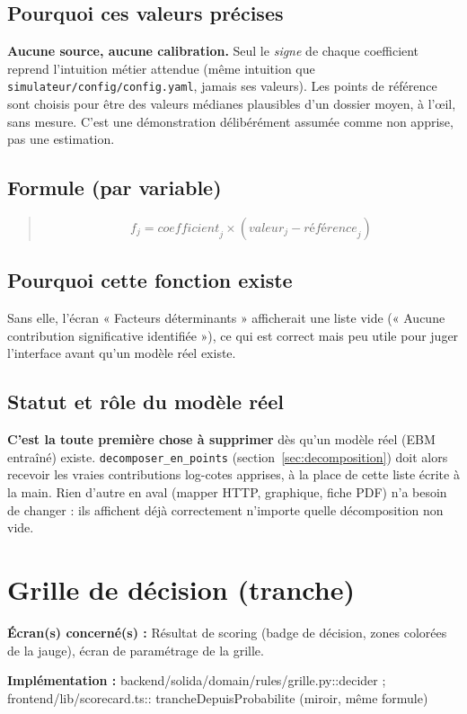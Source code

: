 \documentclass[11pt,a4paper]{article}
\newcommand{\brk}{\allowbreak}
\newcommand{\ecran}[1]{\noindent\textbf{Écran(s) concerné(s) :} #1\par}
\newcommand{\fichier}[1]{\noindent\textbf{Implémentation :} \tiny\ttfamily#1\normalfont\normalsize\par}
\newenvironment{formule}{\begin{quote}}{\end{quote}}
\begin{document}
\subsection*{Pourquoi ces valeurs précises}
\textbf{Aucune source, aucune calibration.} Seul le \emph{signe} de chaque coefficient reprend
l'intuition métier attendue (même intuition que \texttt{simulateur/\brk config/\brk config.yaml},
jamais ses valeurs). Les points de référence sont choisis pour être des valeurs médianes
plausibles d'un dossier moyen, à l'œil, sans mesure. C'est une démonstration délibérément
assumée comme non apprise, pas une estimation.

\subsection*{Formule (par variable)}
\begin{formule}
\[
f_j = \mathit{coefficient}_j \times (\mathit{valeur}_j - \mathit{référence}_j)
\]
\end{formule}

\subsection*{Pourquoi cette fonction existe}
Sans elle, l'écran « Facteurs déterminants » afficherait une liste vide (« Aucune contribution
significative identifiée »), ce qui est correct mais peu utile pour juger l'interface avant qu'un
modèle réel existe.

\subsection*{Statut et rôle du modèle réel}
\textbf{C'est la toute première chose à supprimer} dès qu'un modèle réel (EBM entraîné) existe.
\texttt{decomposer\_en\_points} (section~\ref{sec:decomposition}) doit alors recevoir les vraies
contributions log-cotes apprises, à la place de cette liste écrite à la main. Rien d'autre en
aval (mapper HTTP, graphique, fiche PDF) n'a besoin de changer : ils affichent déjà correctement
n'importe quelle décomposition non vide.

\newpage

\section{Grille de décision (tranche)}
\label{sec:grille}

\ecran{Résultat de scoring (badge de décision, zones colorées de la jauge), écran de paramétrage
de la grille.}
\fichier{backend/\brk solida/\brk domain/\brk rules/\brk grille.py::\brk{}decider ;
frontend/\brk lib/\brk scorecard.ts::\brk{} trancheDepuisProbabilite (miroir, même formule)}
\end{document}
